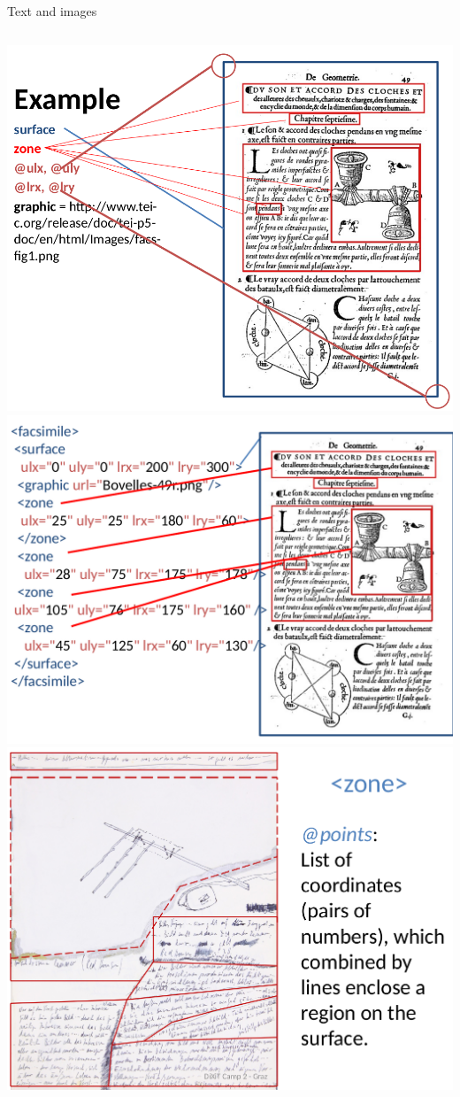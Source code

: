 \begin{frame}{Text and images}
\begin{columns}
\includegraphics[width=\textwidth]{img/facs1.png}
\includegraphics[width=\textwidth]{img/facs2.png}
\includegraphics[width=\textwidth]{img/facs3.png}

\end{columns}
\end{frame}
